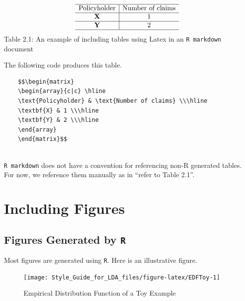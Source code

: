 \documentclass[]{book}
\theoremstyle{definition}
\theoremstyle{definition}
\theoremstyle{definition}
\theoremstyle{remark}
\begin{document}
\[\begin{matrix}
    \begin{array}{c|c} \hline
    \text{Policyholder} & \text{Number of claims} \\\hline
    \textbf{X} & 1 \\\hline
    \textbf{Y} & 2 \\\hline
    \end{array}
    \end{matrix}\] Table 2.1: An example of including tables using Latex
in an \texttt{R\ markdown} document

The following code produces this table.

\begin{verbatim}
    $$\begin{matrix}
    \begin{array}{c|c} \hline
    \text{Policyholder} & \text{Number of claims} \\\hline
    \textbf{X} & 1 \\\hline
    \textbf{Y} & 2 \\\hline
    \end{array}
    \end{matrix}$$
    
\end{verbatim}

\texttt{R\ markdown} does not have a convention for referencing non-R
generated tables. For now, we reference them manually as in ``refer to
Table 2.1''.

\section{Including Figures}\label{including-figures}

\subsection{\texorpdfstring{Figures Generated by
\texttt{R}}{Figures Generated by R}}\label{figures-generated-by-r}

Most figures are generated using \texttt{R}. Here is an illustrative
figure.

\begin{figure}

{\centering \texttt{[image: Style\_Guide\_for\_LDA\_files/figure-latex/EDFToy-1]} 

}

\caption{Empirical Distribution Function of a Toy Example}\label{fig:EDFToy}
\end{figure}
\end{document}
